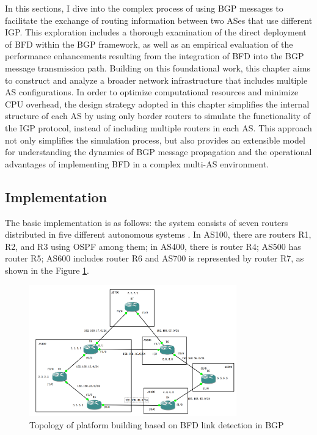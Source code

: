 \documentclass[12pt]{article}
\begin{document}
In this sections, I dive into the complex process of using BGP messages to facilitate the exchange of routing information between two ASes that use different IGP. This exploration includes a thorough examination of the direct deployment of BFD within the BGP framework, as well as an empirical evaluation of the performance enhancements resulting from the integration of BFD into the BGP message transmission path. Building on this foundational work, this chapter aims to construct and analyze a broader network infrastructure that includes multiple AS configurations. In order to optimize computational resources and minimize CPU overhead, the design strategy adopted in this chapter simplifies the internal structure of each AS by using only border routers to simulate the functionality of the IGP protocol, instead of including multiple routers in each AS. This approach not only simplifies the simulation process, but also provides an extensible model for understanding the dynamics of BGP message propagation and the operational advantages of implementing BFD in a complex multi-AS environment.

\subsection{Implementation}
The basic implementation is as follows: the system consists of seven routers distributed in five different autonomous systems . In AS100, there are routers R1, R2, and R3 using OSPF among them; in AS400, there is router R4; AS500 has router R5; AS600 includes router R6 and AS700 is represented by router R7, as shown in the Figure \ref{fig:Topology of platform building based on BFD link detection in BGP}.
\begin{figure}[h]
    \centering
    \includegraphics[width=0.8\textwidth,keepaspectratio]{Graph/BGP topology.png}
    \caption{Topology of platform building based on BFD link detection in BGP} 
    \label{fig:Topology of platform building based on BFD link detection in BGP} 
\end{figure}
\end{document}
